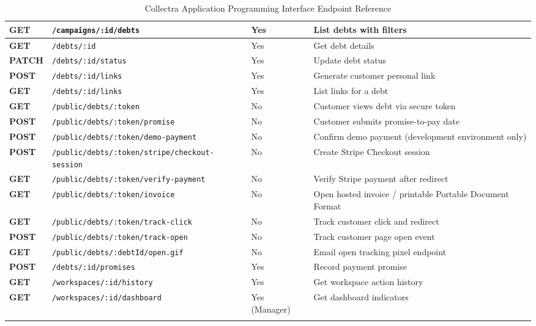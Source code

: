 \documentclass[12pt,a4paper]{report}
\begin{document}
{\begin{longtable}{|>{\bfseries}p{1.3cm}|p{5.6cm}|p{2.4cm}|Y|}
  \hline
  GET   & \texttt{/campaigns/:id/debts}              & Yes            & List debts with filters \\
  \hline
  GET   & \texttt{/debts/:id}                        & Yes            & Get debt details \\
  \hline
  PATCH & \texttt{/debts/:id/status}                 & Yes            & Update debt status \\
  \hline
  POST  & \texttt{/debts/:id/links}                  & Yes            & Generate customer personal link \\
  \hline
  GET   & \texttt{/debts/:id/links}                  & Yes            & List links for a debt \\
  \hline
  GET   & \texttt{/public/debts/:token}              & No             & Customer views debt via secure token \\
  \hline
  POST  & \texttt{/public/debts/:token/promise}      & No             & Customer submits promise-to-pay date \\
  \hline
  POST  & \texttt{/public/debts/:token/demo-payment} & No             & Confirm demo payment (development environment only)\footnotemark \\
  \hline
  POST  & \texttt{/public/debts/:token/stripe/checkout-session} & No & Create Stripe Checkout session \\
  \hline
  GET   & \texttt{/public/debts/:token/verify-payment} & No           & Verify Stripe payment after redirect \\
  \hline
  GET   & \texttt{/public/debts/:token/invoice}      & No             & Open hosted invoice / printable Portable Document Format \\
  \hline
  GET   & \texttt{/public/debts/:token/track-click}  & No             & Track customer click and redirect \\
  \hline
  POST  & \texttt{/public/debts/:token/track-open}   & No             & Track customer page open event \\
  \hline
  GET   & \texttt{/public/debts/:debtId/open.gif}    & No             & Email open tracking pixel endpoint \\
  \hline
  POST  & \texttt{/debts/:id/promises}               & Yes            & Record payment promise \\
  \hline
  GET   & \texttt{/workspaces/:id/history}           & Yes            & Get workspace action history \\
  \hline
  GET   & \texttt{/workspaces/:id/dashboard}         & Yes (Manager)  & Get dashboard indicators \\
  \hline
  \caption{Collectra Application Programming Interface Endpoint Reference}
  \label{tab:api-endpoints}
\end{longtable}
}
\end{document}
